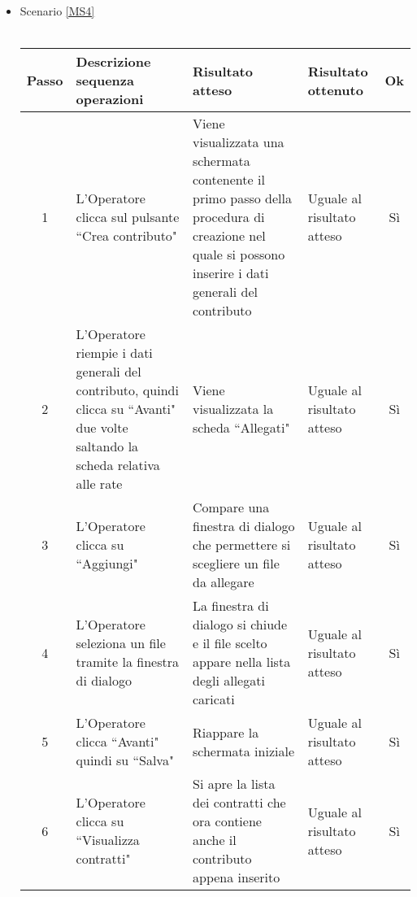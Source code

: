 \begin{itemize}
 \item Scenario \ref{MS4}\\\\
 {
 \footnotesize
  \begin{longtable}{|c|p{3cm}|p{3cm}|p{3cm}|c|}
    \hline
    Passo & Descrizione sequenza operazioni & Risultato atteso & Risultato ottenuto & Ok\\
    \hline
    1 & L'Operatore clicca sul pulsante ``Crea contributo" & Viene visualizzata una schermata contenente il primo passo della procedura di creazione nel quale si possono inserire i dati generali del contributo& Uguale 
      al risultato atteso& Sì\\
    \hline
    2 & L'Operatore riempie i dati generali del contributo, quindi clicca su ``Avanti" due volte saltando la scheda relativa alle rate & Viene visualizzata la scheda ``Allegati" & Uguale al risultato atteso & Sì \\
    \hline
     3 & L'Operatore clicca su ``Aggiungi"& Compare una finestra di dialogo che permettere si scegliere un file da allegare & Uguale al risultato atteso & Sì \\
    \hline
    4 & L'Operatore seleziona un file tramite la finestra di dialogo & La finestra di dialogo si chiude e il file scelto appare nella lista degli allegati caricati & Uguale al risultato atteso & Sì\\
    \hline
    5 & L'Operatore clicca ``Avanti" quindi su ``Salva" & Riappare la schermata iniziale & Uguale al risultato atteso & Sì\\
    \hline
    6 & L'Operatore clicca su ``Visualizza contratti"& Si apre la lista dei contratti che ora contiene anche il contributo appena inserito & Uguale al risultato atteso & Sì\\    
    \hline
\end{longtable}

}



\end{itemize}
